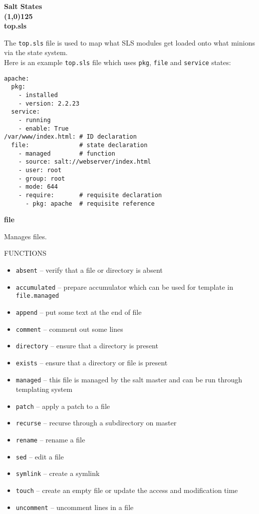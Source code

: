 \documentclass[landscape,a4paper,10pt]{article}
\begin{document}
\begin{multicols}{3}

\bfseries{\Huge{Salt States}}\\[-0.3cm]
\line(1,0){125}\\

\bfseries{\LARGE{top.sls}}

The \texttt{top.sls} file is used to map what SLS modules get loaded onto what minions via the state system.\\

Here is an example \texttt{top.sls} file which uses \texttt{pkg}, \texttt{file} and \texttt{service} states:

\begin{verbatim}
apache:
  pkg:
    - installed
    - version: 2.2.23
  service:
    - running
    - enable: True
/var/www/index.html: # ID declaration
  file:              # state declaration
    - managed        # function
    - source: salt://webserver/index.html
    - user: root
    - group: root
    - mode: 644
    - require:       # requisite declaration
      - pkg: apache  # requisite reference
\end{verbatim}


\bfseries{\LARGE{file}}

Manages files.

FUNCTIONS


\begin{itemize}
  \item \texttt{absent}  -- verify that a file or directory is absent
  \item \texttt{accumulated}  -- prepare accumulator which can be used for template in \texttt{file.managed}
  \item \texttt{append}  -- put some text at the end of file
  \item \texttt{comment}  -- comment out some lines
  \item \texttt{directory}  -- ensure that a directory is present
  \item \texttt{exists}  -- ensure that a directory or file is present
  \item \texttt{managed}  -- this file is managed by the salt master and can be run through templating system
  \item \texttt{patch}  -- apply a patch to a file
  \item \texttt{recurse}  -- recurse through a subdirectory on master
  \item \texttt{rename}  -- rename a file
  \item \texttt{sed}  -- edit a file
  \item \texttt{symlink}  -- create a symlink
  \item \texttt{touch}  -- create an empty file or update the access and modification time
  \item \texttt{uncomment}  -- uncomment lines in a file
\end{itemize}


\end{multicols}
\end{document}
